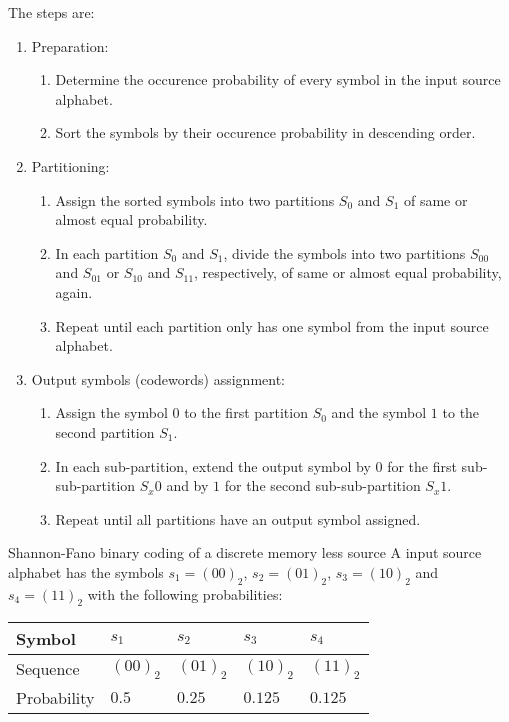\begin{refsection}
The steps are:
\begin{enumerate}
	\item Preparation:
	\begin{enumerate}
		\item Determine the occurence probability of every symbol in the input source alphabet.
		\item Sort the symbols by their occurence probability in descending order.
	\end{enumerate}
	\item Partitioning:
	\begin{enumerate}
		\item Assign the sorted symbols into two partitions $S_0$ and $S_1$ of same or almost equal probability.
		\item In each partition $S_0$ and $S_1$, divide the symbols into two partitions $S_{00}$ and $S_{01}$ or $S_{10}$ and $S_{11}$, respectively, of same or almost equal probability, again.
		\item Repeat until each partition only has one symbol from the input source alphabet.
	\end{enumerate}
	\item Output symbols (codewords) assignment:
	\begin{enumerate}
		\item Assign the symbol $0$ to the first partition $S_0$ and the symbol $1$ to the second partition $S_1$.
		\item In each sub-partition, extend the output symbol by $0$ for the first sub-sub-partition $S_x0$ and by $1$ for the second sub-sub-partition $S_x1$.
		\item Repeat until all partitions have an output symbol assigned.
	\end{enumerate}
\end{enumerate}

\begin{example}{Shannon-Fano binary coding of a discrete memory less source}
	A input source alphabet has the symbols $s_1 = (00)_2$, $s_2 = (01)_2$, $s_3 = (10)_2$ and $s_4 = (11)_2$ with the following probabilities:
	\begin{table}[H]
		\centering
		\begin{tabular}{|l|l|l|l|l|}
			\hline
			Symbol & $s_1$ & $s_2$ & $s_3$ & $s_4$ \\
			\hline
			Sequence & $(00)_2$ & $(01)_2$ & $(10)_2$ & $(11)_2$ \\
			\hline
			Probability & $0.5$ & $0.25$ & $0.125$ & $0.125$ \\
			\hline
		\end{tabular}
	\end{table}


\end{example}
\end{refsection}
